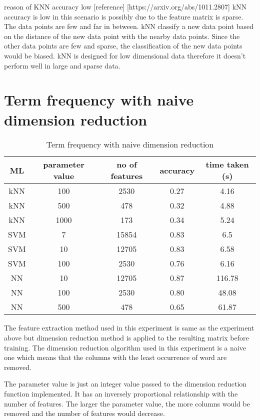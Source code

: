 reason of KNN accuracy low [reference] [https://arxiv.org/abs/1011.2807]
kNN accuracy is low in this scenario is possibly due to the feature matrix is sparse. The data points are few and far in between. kNN classify a new data point based on the distance of the new data point with the nearby data points. Since the other data points are few and sparse, the classification of the new data points would be biased. kNN is designed for low dimensional data therefore it doesn't perform well in large and sparse data.

\section{Term frequency with naive dimension reduction}

\begin{table} [ht]
	\centering
	\begin{tabular}{|| c | c | c | c | c||}
		\hline
		ML & parameter value & no of features & accuracy & time taken (s) \\ [0.5ex]
		\hline\hline
		kNN & 100 & 2530 & 0.27 & 4.16 \\ 
		\hline
		kNN & 500 & 478 & 0.32 & 4.88 \\ 
		\hline
		kNN & 1000 & 173 & 0.34 & 5.24 \\ 
		\hline\hline
		SVM & 7 & 15854 & 0.83 & 6.5 \\
		\hline
		SVM & 10 & 12705 & 0.83 & 6.58 \\
		\hline
		SVM & 100 & 2530 & 0.76 & 6.16 \\
		\hline\hline
		NN & 10 & 12705 & 0.87 & 116.78 \\
		\hline
		NN & 100 & 2530 & 0.80 & 48.08 \\
		\hline
		NN & 500 & 478 & 0.65 & 61.87 \\
		\hline\hline
	\end{tabular}
\caption{Term frequency with naive dimension reduction}
\label{tbl:termFrequencyNaive}
\end{table}

The feature extraction method used in this experiment is same as the experiment above but dimension reduction method is applied to the resulting matrix before training. The dimension reduction algorithm used in this experiment is a naive one which means that the columns with the least occurrence of word are removed.

The parameter value is just an integer value passed to the dimension reduction function implemented. It has an inversely proportional relationship with the number of features. The larger the parameter value, the more columns would be removed and the number of features would decrease.

